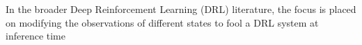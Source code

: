 In the broader Deep Reinforcement Learning (DRL) literature, the focus is placed on modifying the observations of different states to fool a DRL system at inference time
\cite{hussenot2019targeted, sunstealthy} 
